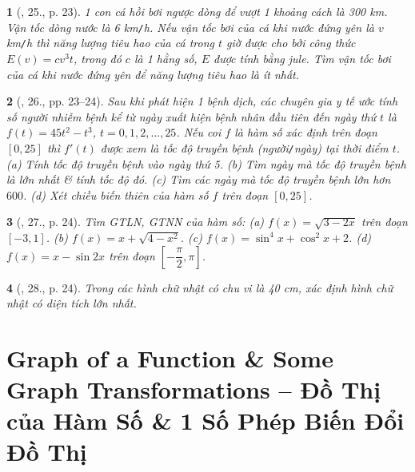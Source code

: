 \documentclass{article}
\newtheorem{baitoan}{}
\begin{document}
\begin{baitoan}[\cite{SGK_Toan_12_giai_tich_nang_cao}, 25., p. 23]
	1 con cá hồi bơi ngược dòng để vượt 1 khoảng cách là {\rm300 km}. Vận tốc dòng nước là {\rm6 km{\tt/}h}. Nếu vận tốc bơi của cá khi nước đứng yên là $v$ {\rm km{\tt/}h} thì năng lượng tiêu hao của cá trong $t$ giờ được cho bởi công thức $E(v) = cv^3t$, trong đó $c$ là 1 hằng số, $E$ được tính bằng jule. Tìm vận tốc bơi của cá khi nước đứng yên để năng lượng tiêu hao là ít nhất.
\end{baitoan}

\begin{baitoan}[\cite{SGK_Toan_12_giai_tich_nang_cao}, 26., pp. 23--24]
	Sau khi phát hiện 1 bệnh dịch, các chuyên gia y tế ước tính số người nhiễm bệnh kể từ ngày xuất hiện bệnh nhân đầu tiên đến ngày thứ $t$ là $f(t) = 45t^2 - t^3$, $t = 0,1,2,\ldots,25$. Nếu coi $f$ là hàm số xác định trên đoạn $[0,25]$ thì $f'(t)$ được xem là tốc độ truyền bệnh (người{\tt/}ngày) tại thời điểm $t$. (a) Tính tốc độ truyền bệnh vào ngày thứ 5. (b) Tìm ngày mà tốc độ truyền bệnh là lớn nhất \& tính tốc độ đó. (c) Tìm các ngày mà tốc độ truyền bệnh lớn hơn $600$. (d) Xét chiều biến thiên của hàm số $f$ trên đoạn $[0,25]$.
\end{baitoan}

\begin{baitoan}[\cite{SGK_Toan_12_giai_tich_nang_cao}, 27., p. 24]
	Tìm {\rm GTLN, GTNN} của hàm số: (a) $f(x) = \sqrt{3 - 2x}$ trên đoạn $[-3,1]$. (b) $f(x) = x + \sqrt{4 - x^2}$. (c) $f(x) = \sin^4x + \cos^2x + 2$. (d) $f(x) = x - \sin2x$ trên đoạn $\left[-\dfrac{\pi}{2},\pi\right]$.
\end{baitoan}

\begin{baitoan}[\cite{SGK_Toan_12_giai_tich_nang_cao}, 28., p. 24]
	Trong các hình chữ nhật có chu vi là {\rm40 cm}, xác định hình chữ nhật có diện tích lớn nhất.
\end{baitoan}


\section{Graph of a Function \& Some Graph Transformations -- Đồ Thị của Hàm Số \& 1 Số Phép Biến Đổi Đồ Thị}
\end{document}
